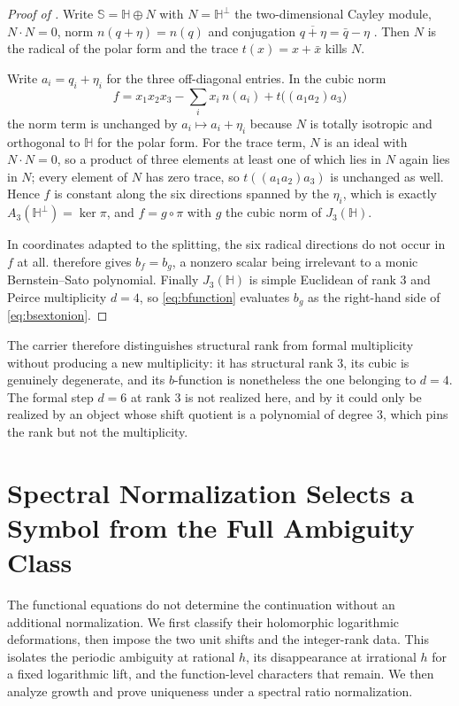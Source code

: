\documentclass[11pt,letterpaper]{article}
\begin{document}
\begin{proof}[Proof of ]
Write $\mathbb{S}=\mathbb{H}\oplus N$ with $N=\mathbb{H}^{\perp}$ the
two-dimensional Cayley module, $N\cdot N=0$, norm $n(q+\eta)=n(q)$ and
conjugation $\overline{q+\eta}=\bar q-\eta$ \cite[Def.~3.1]{Westbury}. Then $N$ is
the radical of the polar form and the trace $t(x)=x+\bar x$ kills $N$.

Write $a_i=q_i+\eta_i$ for the three off-diagonal entries. In the cubic norm
\begin{equation*}
  f=x_1x_2x_3-\sum_{i}x_i\,n(a_i)+t\bigl((a_1a_2)a_3\bigr)
\end{equation*}
the norm term is unchanged by $a_i\mapsto a_i+\eta_i$ because $N$ is totally
isotropic and orthogonal to $\mathbb{H}$ for the polar form. For the trace term,
$N$ is an ideal with $N\cdot N=0$, so a product of three elements at least one of
which lies in $N$ again lies in $N$; every element of $N$ has zero trace, so
$t((a_1a_2)a_3)$ is unchanged as well. Hence $f$ is constant along the six
directions spanned by the $\eta_i$, which is exactly
$A_3(\mathbb{H}^{\perp})=\ker\pi$, and $f=g\circ\pi$ with $g$ the cubic norm of
$J_3(\mathbb{H})$.

In coordinates adapted to the splitting, the six radical directions do not occur
in $f$ at all.  therefore gives $b_f=b_g$, a nonzero scalar
being irrelevant to a monic Bernstein--Sato polynomial. Finally $J_3(\mathbb{H})$
is simple Euclidean of rank $3$ and Peirce multiplicity $d=4$, so
\eqref{eq:bfunction} evaluates $b_g$ as the right-hand side of
\eqref{eq:bsextonion}.
\end{proof}

The carrier therefore distinguishes structural rank from formal multiplicity
without producing a new multiplicity: it has structural rank $3$, its cubic is
genuinely degenerate, and its $b$-function is nonetheless the one belonging to
$d=4$. The formal step $d=6$ at rank $3$ is not realized here, and by
 it could only be realized by an object whose shift quotient
is a polynomial of degree $3$, which pins the rank but not the multiplicity.

\section{Spectral Normalization Selects a Symbol from the Full Ambiguity Class}
\label{sec:uniqueness}

The functional equations do not determine the continuation without an additional
normalization. We first classify their holomorphic logarithmic deformations, then
impose the two unit shifts and the integer-rank data. This isolates the periodic
ambiguity at rational $h$, its disappearance at irrational $h$ for a fixed
logarithmic lift, and the function-level characters that remain. We then analyze
growth and prove uniqueness under a spectral ratio normalization.
\end{document}
